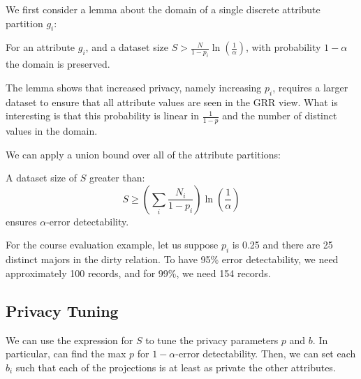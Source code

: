 We first consider a lemma about the domain of a single discrete attribute partition $g_i$:
\begin{lemma}
For an attribute $g_i$, and a dataset size $S>\frac{N}{1-p_i}\ln(\frac{1}{\alpha})$, with probability $1-\alpha$ the domain is preserved. 
\end{lemma}
\iffalse
\begin{proof}
First, let us start with the
probability that one value $x$ is not preserved:
\[
P[x\text{ is masked}]=\alpha=[\frac{p(N-1)}{N}]^{S}
\]
If we solve for $S$, apply the inequalities that $\frac{N-1}{N}\le1$
and $ln(x)\le x-1$, we get
\[
\frac{\ln(\frac{1}{\alpha})}{1-p}\le S
\]
Then applying a union bound we get:
\[
\frac{N}{1-p}\ln(\frac{1}{\alpha})\le S
\]
\end{proof}
\fi
The lemma shows that increased privacy, namely increasing $p_i$, requires a larger dataset to ensure that all attribute values are seen in the GRR view.
What is interesting is that this probability is linear in $\frac{1}{1-p}$ and the number of distinct values in the domain.

We can apply a union bound over all of the attribute partitions:
\begin{theorem}
A dataset size of $S$ greater than:
\[
S\ge(\sum_{i}\frac{N_{i}}{1-p_{i}})\ln(\frac{1}{\alpha})
\]
ensures $\alpha$-error detectability.
\end{theorem}
\iffalse
\begin{proof}
We apply a union bound to arrive at the formula:
\[
S\ge(\sum_{i}\frac{N_{i}}{1-p_{i}})\ln(\frac{1}{\alpha})
\]
\end{proof}
\fi

\begin{example}
For the course evaluation example, let us suppose $p_i$ is 0.25 and there are 25 distinct majors in the dirty relation. To have 95\% error detectability, we need approximately 100 records, and for 99\%, we need 154 records.
\end{example}

\subsection{Privacy Tuning}
We can use the expression for $S$ to tune the privacy parameters $p$ and $b$. 
In particular, can find the max $p$ for $1-\alpha$-error detectability.
Then, we can set each $b_i$ such that each of the projections is at least as private the other attributes.


